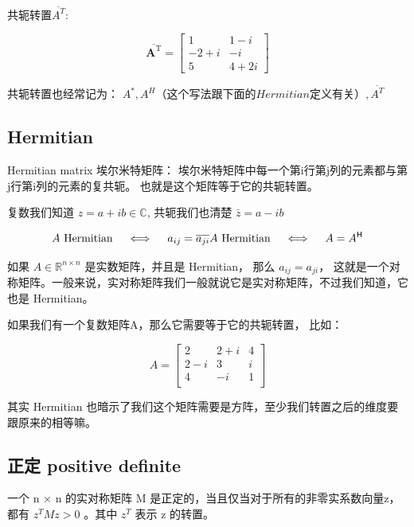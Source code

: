 \documentclass[
]{book}
\begin{document}
共轭转置\(\overline{A^T}\):

\[{\displaystyle \overline{{\boldsymbol {{A}}}^{\mathrm {T}} }={\begin{bmatrix}1&1-i\\-2+i&-i\\5&4+2i\end{bmatrix}}}\]

共轭转置也经常记为： \(A^*, A^H（这个写法跟下面的 Hermitian 定义有关）, \overline{A^T}\)

\hypertarget{hermitian}{%
\subsection{Hermitian}\label{hermitian}}

Hermitian matrix 埃尔米特矩阵： 埃尔米特矩阵中每一个第i行第j列的元素都与第j行第i列的元素的复共轭。 也就是这个矩阵等于它的共轭转置。

复数我们知道 \(z = a + ib \in \mathbb{C}\), 共轭我们也清楚 \(\bar{z} = a - ib\)

\[
{\displaystyle A{\text{ Hermitian}}\quad \iff \quad a_{ij}={\overline {a_{ji}}}} \\
{\displaystyle A{\text{ Hermitian}}\quad \iff \quad A=A^{\mathsf {H}}}
\]

如果 \(A \in \mathbb{R}^{n \times n}\) 是实数矩阵，并且是 Hermitian， 那么 \(a_{ij} = a_{ji}\)， 这就是一个对称矩阵。一般来说，实对称矩阵我们一般就说它是实对称矩阵，不过我们知道，它也是 Hermitian。

如果我们有一个复数矩阵A，那么它需要等于它的共轭转置， 比如：

\[
{\displaystyle A = {\begin{bmatrix}2&2+i&4\\2-i&3&i\\4&-i&1\\\end{bmatrix}}}
\]

其实 Hermitian 也暗示了我们这个矩阵需要是方阵，至少我们转置之后的维度要跟原来的相等嘛。

\hypertarget{ux6b63ux5b9a-positive-definite}{%
\subsection{正定 positive definite}\label{ux6b63ux5b9a-positive-definite}}

一个 n × n 的实对称矩阵 M 是正定的，当且仅当对于所有的非零实系数向量z，都有 \(z^TMz > 0\) 。其中 \(z^T\) 表示 z 的转置。
\end{document}
